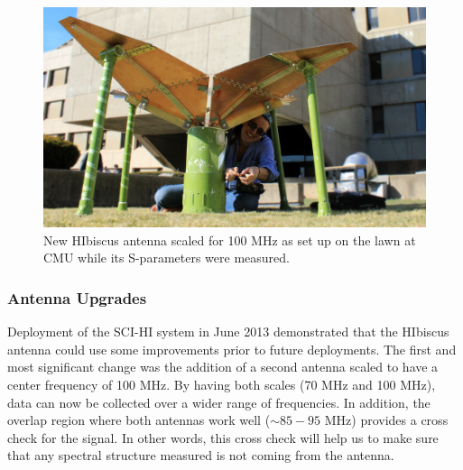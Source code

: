 
\begin{figure}[htb]
\begin{center}
\includegraphics[width=0.95\linewidth]{SCIHI_system/figures/HIbiscus_100mhz.jpg}
\caption{New HIbiscus antenna scaled for 100 MHz as set up on the lawn at CMU while its S-parameters were measured. }
\label{Fig:hibiscus_100}
\end{center}
\end{figure}

\subsubsection{Antenna Upgrades} \label{Sec:HIant_upgrade}
Deployment of the SCI-HI system in June 2013 demonstrated that the HIbiscus antenna could use some improvements prior to future deployments. The first and most significant change was the addition of a second antenna scaled to have a center frequency of 100 MHz. By having both scales (70 MHz and 100 MHz), data can now be collected over a wider range of frequencies. In addition, the overlap region where both antennas work well ($\sim 85-95$ MHz) provides a cross check for the signal. In other words, this cross check will help us to make sure that any spectral structure measured is not coming from the antenna. 

